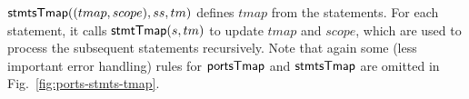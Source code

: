 


%

${\sf stmtsTmap}((tmap, scope), ss, tm)$ defines $tmap$ from the statements. For each statement, it calls ${\sf stmtTmap}(s, tm)$ %
to update $tmap$ and $scope$, which are used to process the subsequent statements recursively.
%
%
Note that again %
some (less important error handling) rules for ${\sf portsTmap}$ and ${\sf stmtsTmap}$ are omitted in Fig.~\ref{fig:ports-stmts-tmap}.

